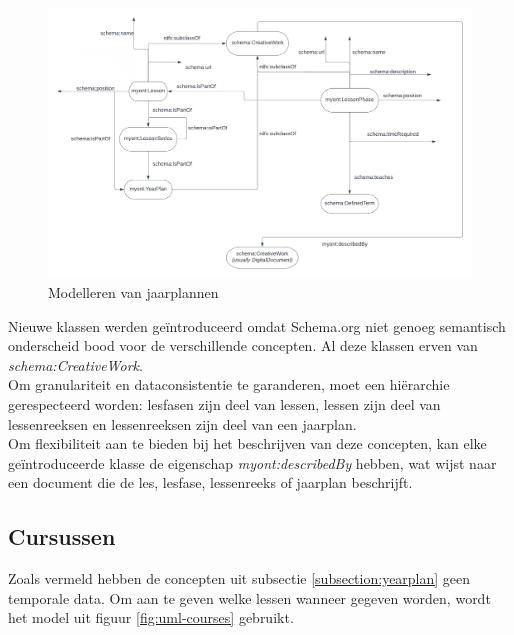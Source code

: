 \documentclass[12pt,journal]{IEEEtran}
\begin{document}
	\begin{figure}[h]
		\caption{Modelleren van jaarplannen}
		\label{fig:uml-lesson}
		\includegraphics[scale=0.3]{uml-lessons.png}
	\end{figure}
	\noindent Nieuwe klassen werden geïntroduceerd omdat Schema.org niet genoeg semantisch onderscheid bood voor de verschillende concepten.
	Al deze klassen erven van \textit{schema:CreativeWork}.\\
	Om granulariteit en dataconsistentie te garanderen, moet een hiërarchie gerespecteerd worden: lesfasen zijn deel van lessen, lessen zijn deel van lessenreeksen en lessenreeksen zijn deel van een jaarplan.\\
	Om flexibiliteit aan te bieden bij het beschrijven van deze concepten, kan elke geïntroduceerde klasse de eigenschap \textit{myont:describedBy} hebben, wat wijst naar een document die de les, lesfase, lessenreeks of jaarplan beschrijft.

	\subsection{Cursussen}
	\noindent Zoals vermeld hebben de concepten uit subsectie \ref{subsection:yearplan} geen temporale data.
	Om aan te geven welke lessen wanneer gegeven worden, wordt het model uit figuur \ref{fig:uml-courses} gebruikt.
\end{document}
